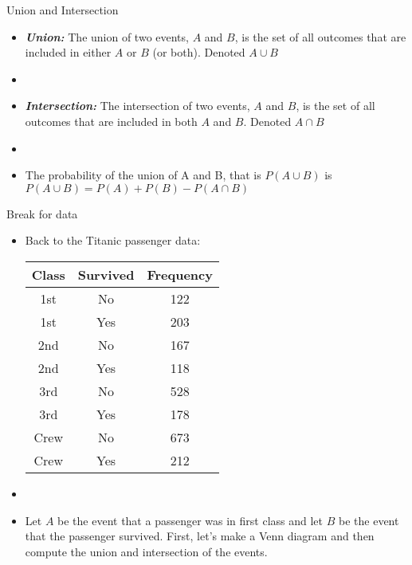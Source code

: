 \documentclass[xcolor=dvipsnames]{beamer}
\begin{document}
\begin{frame}{Union and Intersection}
	\begin{itemize}
		\item \textbf{\emph{Union:}} The union of two events, $A$ and $B$, is the set of all outcomes that are included in either $A$ or $B$ (or both). Denoted $A \cup B$ \pause
		\item[]
		\item \textbf{\emph{Intersection:}} The intersection of two events, $A$ and $B$, is the set of all outcomes that are included in both $A$ and $B$. Denoted $A \cap B$ \pause
		\item[]
		\item The probability of the union of A and B, that is $P(A\cup B)$ is $P(A \cup B) = P(A) + P(B) - P(A\cap B)$
	\end{itemize}
\end{frame}

\begin{frame}{Break for data}
\begin{itemize}
	\item Back to the Titanic passenger data:
	\begin{center}
		\begin{tabular}{|c|c|c|} \hline
			\textbf{Class} & \textbf{Survived} & \textbf{Frequency} \\ \hline \hline
			1st  & No       &        122 \\ \hline 
			1st   &Yes       &       203\\ \hline 
			2nd   &No         &      167\\ \hline 
			2nd   &Yes         &     118\\ \hline 
			3rd   &No           &    528\\ \hline 
			3rd   &Yes           &   178\\ \hline 
			Crew  &No             &  673\\ \hline 
			Crew  &Yes             & 212\\ \hline 
		\end{tabular}
	\end{center} \pause
	\item[]
	\item Let $A$ be the event that a passenger was in first class and let $B$ be the event that the passenger survived. First, let's make a Venn diagram and then compute the union and intersection of the events.
\end{itemize}
\end{frame}
\end{document}
